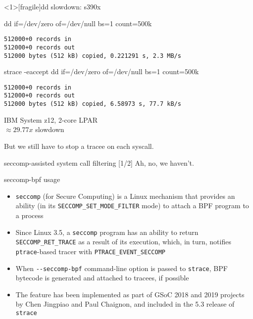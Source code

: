 \documentclass[unicode]{beamer}
\begin{document}
\begin{frame}<1>[fragile]{dd slowdown: s390x}
\begin{block}{\large dd if=/dev/zero of=/dev/null bs=1 count=500k}
\begin{verbatim}
512000+0 records in
512000+0 records out
512000 bytes (512 kB) copied, 0.221291 s, 2.3 MB/s
\end{verbatim}
\end{block}
\begin{block}{\large strace -eaccept dd if=/dev/zero of=/dev/null bs=1 count=500k}
\begin{verbatim}
512000+0 records in
512000+0 records out
512000 bytes (512 kB) copied, 6.58973 s, 77.7 kB/s
\end{verbatim}
\end{block}
\begin{scriptsize}
IBM System z12, 2-core LPAR \\
$\approx 29.77x$ slowdown \\
\end{scriptsize}
\pause
But we still have to stop a tracee on each syscall.
\end{frame}



\begin{frame}{seccomp-assisted system call filtering \hfill [1/2]}
Ah, no, we haven't.
\begin{block}{\large seccomp-bpf usage}
\begin{itemize}
  \item \texttt{seccomp} (for Secure Computing) is a Linux mechanism
        that provides an ability (in its \texttt{SECCOMP\_SET\_MODE\_FILTER}
        mode) to attach a BPF program to a process
  \item Since Linux 3.5, a \texttt{seccomp} program has an ability
        to return \texttt{SECCOMP\_RET\_TRACE} as a result of its execution,
        which, in turn, notifies \texttt{ptrace}-based tracer with
        \texttt{PTRACE\_EVENT\_SECCOMP}
  \item When \texttt{-{}-seccomp-bpf} command-line option is passed
        to \texttt{strace}, BPF bytecode is generated and attached to tracees,
        if possible
  \item The feature has been implemented as part of GSoC 2018 and 2019 projects
        by Chen Jingpiao and Paul Chaignon, and included
        in the 5.3 release of \texttt{strace}
\end{itemize}
\end{block}
\end{frame}
\end{document}
